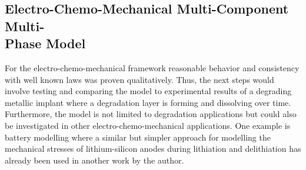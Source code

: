 \subsection*{Electro-Chemo-Mechanical Multi-Component Multi-\\Phase Model}
For the electro-chemo-mechanical framework reasonable behavior and consistency with well known laws was proven qualitatively. Thus, the next steps would involve testing and comparing the model to experimental results of a degrading metallic implant where a degradation layer is forming and dissolving over time. Furthermore, the model is not limited to degradation applications but could also be investigated in other electro-chemo-mechanical applications. One example is battery modelling where a similar but simpler approach for modelling the mechanical stresses of lithium-silicon anodes during lithiation and delithiation has already been used in another work by the author\supercite{dittmann_framework_2023}. 